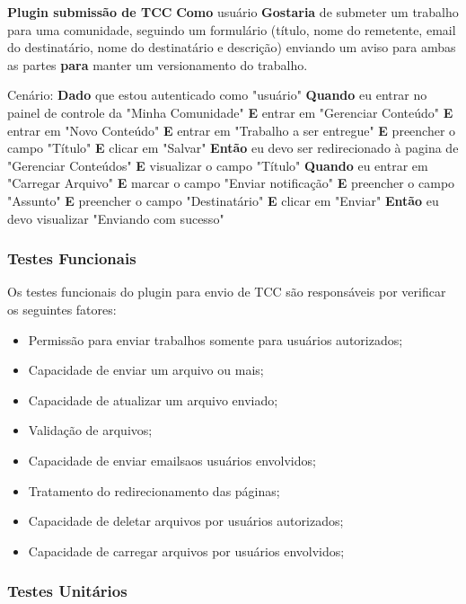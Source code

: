 \textbf{Plugin submissão de TCC}
\textbf{Como} usuário
\textbf{Gostaria} de submeter um trabalho para uma comunidade, seguindo um formulário (título, nome do remetente, email do destinatário, nome do destinatário e descrição) enviando um aviso para ambas as partes
\textbf{para} manter um versionamento do trabalho.

Cenário:
\textbf{Dado} que estou autenticado como "usuário"
\textbf{Quando} eu entrar no painel de controle da "Minha Comunidade"
\textbf{E} entrar em "Gerenciar Conteúdo"
\textbf{E} entrar em "Novo Conteúdo"
\textbf{E} entrar em "Trabalho a ser entregue"
\textbf{E} preencher o campo "Título"
\textbf{E} clicar em "Salvar"
\textbf{Então} eu devo ser redirecionado à pagina de "Gerenciar Conteúdos"
\textbf{E} visualizar o campo "Título"
\textbf{Quando} eu entrar em "Carregar Arquivo"
\textbf{E} marcar o campo "Enviar notificação"
\textbf{E} preencher o campo "Assunto"
\textbf{E} preencher o campo "Destinatário"
\textbf{E} clicar em "Enviar"
\textbf{Então} eu devo visualizar "Enviando com sucesso"


\subsubsection{Testes Funcionais}

Os testes funcionais do plugin para envio de TCC são responsáveis por verificar os seguintes fatores:

\begin{itemize}
\item Permissão para enviar trabalhos somente para usuários autorizados;
\item Capacidade de enviar um arquivo ou mais;
\item Capacidade de atualizar um arquivo enviado;
\item Validação de arquivos;
\item Capacidade de enviar emailsaos usuários envolvidos;
\item Tratamento do redirecionamento das páginas;
\item Capacidade de deletar arquivos por usuários autorizados;
\item Capacidade de carregar arquivos por usuários envolvidos;
\end{itemize}

\subsubsection{Testes Unitários}


